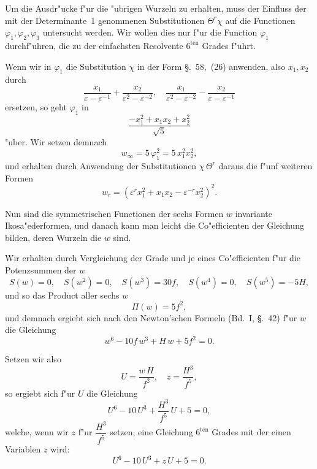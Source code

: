 \documentclass[12pt,a4paper]{article}
\theoremstyle{plain}
\begin{document}
Um die Ausdr"ucke f"ur die "ubrigen Wurzeln zu erhalten, muss der Einfluss der mit der Determinante~1 genommenen Substitutionen $\Theta^r\chi$ auf die Functionen $\varphi_1, \varphi_2, \varphi_3$ untersucht werden. Wir wollen dies nur f"ur die Function $\varphi_1$ durchf"uhren, die zu der einfachsten Resolvente $6^{\text{ten}}$ Grades f"uhrt.

Wenn wir in $\varphi_1$ die Substitution $\chi$ in der Form \S.~58,~(26) anwenden, also $x_1, x_2$ durch
\[\frac{x_1}{\varepsilon - \varepsilon^{-1}} + \frac{x_2}{\varepsilon^2 - \varepsilon^{-2}}, \quad \frac{x_1}{\varepsilon^2 - \varepsilon^{-2}} - \frac{x_2}{\varepsilon - \varepsilon^{-1}}\]
ersetzen, so geht $\varphi_1$ in
\[\frac{-x_1^2 + x_1 x_2 + x_2^2}{\sqrt{5}}\]
"uber. Wir setzen demnach
\begin{equation}\tag{3}
w_\infty = 5\,\varphi_1^2 = 5\,x_1^2 x_2^2,
\end{equation}
und erhalten durch Anwendung der Substitutionen $\chi\,\Theta^r$ daraus die f"unf weiteren Formen
\begin{equation}\tag{4}
w_r = (\varepsilon^r x_1^2 + x_1 x_2 - \varepsilon^{-r} x_2^2)^2.
\end{equation}

Nun sind die symmetrischen Functionen der sechs Formen $w$ invariante Ikosa"ederformen, und danach kann man leicht die Co"efficienten der Gleichung bilden, deren Wurzeln die $w$ sind.

Wir erhalten durch Vergleichung der Grade und je eines Co"efficienten f"ur die Potenzsummen der $w$
\[S(w)=0, \quad S(w^2)=0, \quad S(w^3)=30f, \quad S(w^4)=0, \quad S(w^5)=-5H,\]
und so das Product aller sechs $w$
\[\Pi(w) = 5f^2,\]
und demnach ergiebt sich nach den Newton'schen Formeln (Bd.~I, \S.~42) f"ur $w$ die Gleichung
\begin{equation}\tag{5}
w^6 - 10f\,w^3 + H\,w + 5f^2 = 0.
\end{equation}

Setzen wir also
\begin{equation}\tag{6}
U = \frac{w\,H}{f^2}, \quad z = \frac{H^3}{f^5},
\end{equation}
so ergiebt sich f"ur $U$ die Gleichung
\begin{equation}\tag{7}
U^6 - 10\,U^3 + \frac{H^3}{f^5}\,U + 5 = 0,
\end{equation}
welche, wenn wir $z$ f"ur $\dfrac{H^3}{f^5}$ setzen, eine Gleichung $6^{\text{ten}}$ Grades mit der einen Variablen $z$ wird:
\begin{equation}\tag{8}
U^6 - 10\,U^3 + z\,U + 5 = 0.
\end{equation}
\end{document}
